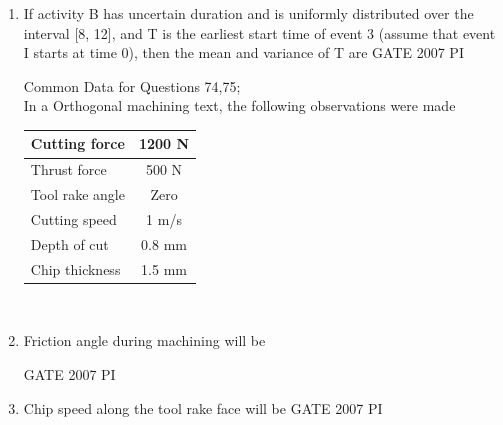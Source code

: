 \documentclass[journal,12pt,onecolumn]{IEEEtran}
\theoremstyle{remark}
\begin{document}
\begin{enumerate}
\item 
If activity B has uncertain duration and is uniformly distributed over the interval [8, 12], and T is the earliest start time of event 3 (assume that event I starts at time 0), then the mean and variance of T are
\hfill{GATE 2007 PI}
\begin{enumerate}
    \end{enumerate}
{Common Data for Questions 74,75;}\\
In a Orthogonal machining text, the following observations were made\\
\begin{tabular}{|l|c|}
\hline
{Cutting force} & 1200 N \\ \hline
{Thrust force} & 500 N \\ \hline
{Tool rake angle} & Zero \\ \hline
{Cutting speed} & 1 m/s \\ \hline
{Depth of cut} & 0.8 mm \\ \hline
{Chip thickness} & 1.5 mm \\ \hline
\end{tabular}\\




\item 
Friction angle during machining will be

\hfill{GATE 2007 PI}
\begin{enumerate}
    \end{enumerate}
    
    \item 
    Chip speed along the tool rake face will be
\hfill{GATE 2007 PI}
\begin{enumerate}
    \end{enumerate}
  


\end{enumerate}
\end{document}
